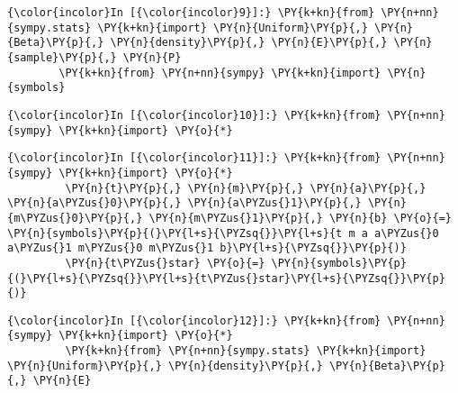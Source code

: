     \begin{Verbatim}[commandchars=\\\{\}]
{\color{incolor}In [{\color{incolor}9}]:} \PY{k+kn}{from} \PY{n+nn}{sympy.stats} \PY{k+kn}{import} \PY{n}{Uniform}\PY{p}{,} \PY{n}{Beta}\PY{p}{,} \PY{n}{density}\PY{p}{,} \PY{n}{E}\PY{p}{,} \PY{n}{sample}\PY{p}{,} \PY{n}{P}
        \PY{k+kn}{from} \PY{n+nn}{sympy} \PY{k+kn}{import} \PY{n}{symbols}
\end{Verbatim}

    \begin{Verbatim}[commandchars=\\\{\}]
{\color{incolor}In [{\color{incolor}10}]:} \PY{k+kn}{from} \PY{n+nn}{sympy} \PY{k+kn}{import} \PY{o}{*}
\end{Verbatim}

    \begin{Verbatim}[commandchars=\\\{\}]
{\color{incolor}In [{\color{incolor}11}]:} \PY{k+kn}{from} \PY{n+nn}{sympy} \PY{k+kn}{import} \PY{o}{*}
         \PY{n}{t}\PY{p}{,} \PY{n}{m}\PY{p}{,} \PY{n}{a}\PY{p}{,} \PY{n}{a\PYZus{}0}\PY{p}{,} \PY{n}{a\PYZus{}1}\PY{p}{,} \PY{n}{m\PYZus{}0}\PY{p}{,} \PY{n}{m\PYZus{}1}\PY{p}{,} \PY{n}{b} \PY{o}{=} \PY{n}{symbols}\PY{p}{(}\PY{l+s}{\PYZsq{}}\PY{l+s}{t m a a\PYZus{}0 a\PYZus{}1 m\PYZus{}0 m\PYZus{}1 b}\PY{l+s}{\PYZsq{}}\PY{p}{)}
         \PY{n}{t\PYZus{}star} \PY{o}{=} \PY{n}{symbols}\PY{p}{(}\PY{l+s}{\PYZsq{}}\PY{l+s}{t\PYZus{}star}\PY{l+s}{\PYZsq{}}\PY{p}{)}
\end{Verbatim}

    \begin{Verbatim}[commandchars=\\\{\}]
{\color{incolor}In [{\color{incolor}12}]:} \PY{k+kn}{from} \PY{n+nn}{sympy} \PY{k+kn}{import} \PY{o}{*}
         \PY{k+kn}{from} \PY{n+nn}{sympy.stats} \PY{k+kn}{import} \PY{n}{Uniform}\PY{p}{,} \PY{n}{density}\PY{p}{,} \PY{n}{Beta}\PY{p}{,} \PY{n}{E}
\end{Verbatim}

